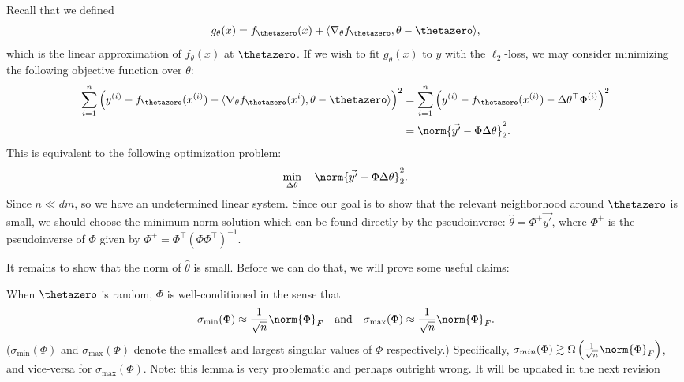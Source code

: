 Recall that we defined
\begin{align}
    g_\theta(x) = f_{\thetazero}(x) + \langle\nabla_\theta f_{\thetazero}, \theta - \thetazero\rangle,
\end{align}
which is the linear approximation of $f_\theta(x)$ at $\thetazero$. If we wish to fit $g_\theta(x)$ to $y$ with the $\ell_2$-loss, we may consider minimizing the following objective function over $\theta$:
\begin{align}
\sum_{i=1}^n \left( y^{(i)} - f_{\thetazero}(x^{(i)}) - \langle \nabla_\theta f_{\thetazero}(x\sp{i}), \theta - \thetazero \rangle \right)^2 
&=  \sum_{i=1}^n \left(y^{(i)} - f_{\thetazero}(x^{(i)}) - \Delta\theta^\top \Phi^{(i)} \right)^2 \\
&=  \norm{\vec{y'} - \Phi \Delta\theta}_2^2.
\end{align}
This is equivalent to the following optimization problem:
\begin{align}
    \min_{\Delta \theta} \quad \norm{\vec{y'} - \Phi \Delta\theta}_2^2. \label{lec12:eqn:opt-problem}
\end{align}
Since $n \ll dm$, so we have an undetermined linear system. Since our goal is to show that the relevant neighborhood around $\thetazero$ is small, we should choose the minimum norm solution which can be found directly by the pseudoinverse: $\hat{\theta} = \Phi^+ \vec{y'}$,  where $\Phi^+$ is the pseudoinverse of $\Phi$ given by $\Phi^+ = \Phi^\top (\Phi \Phi^\top)^{-1}$.

It remains to show that the norm of $\hat{\theta}$ is small. Before we can do that, we will prove some useful claims:

\begin{lemma}\label{lec12:lem:claim1}
When $\thetazero$ is random, $\Phi$ is well-conditioned in the sense that \begin{align}
\sigma_{\min}(\Phi) \approx \frac{1}{\sqrt{n}} \norm{\Phi}_F \quad \text{and} \quad
\sigma_{\max}(\Phi) \approx \frac{1}{\sqrt{n}} \norm{\Phi}_F.
\end{align}
($\sigma_{\min}(\Phi)$ and $\sigma_{\max}(\Phi)$ denote the smallest and largest singular values of $\Phi$ respectively.) Specifically, $\sigma_{min}(\Phi) \gtrsim \Omega \left( \frac{1}{\sqrt{n}} \norm{\Phi}_F \right)$, and vice-versa for $\sigma_{\max}(\Phi)$.
{\color{blue} Note: this lemma is very problematic and perhaps outright wrong. It will be updated in the next revision} 
\end{lemma}

